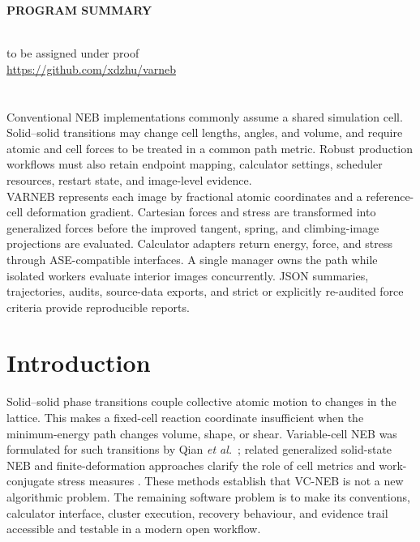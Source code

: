 \documentclass[final,3p,times]{elsarticle}
\begin{document}
{\bf PROGRAM SUMMARY}
\begin{small}
\\
 to be assigned under proof\\
 \url{https://github.com/xdzhu/varneb}\\
\\
\\
 Conventional NEB implementations commonly
assume a shared simulation cell. Solid--solid transitions may change cell
lengths, angles, and volume, and require atomic and cell forces to be treated
in a common path metric. Robust production workflows must also retain endpoint
mapping, calculator settings, scheduler resources, restart state, and
image-level evidence.\\
 VARNEB represents each image by fractional
atomic coordinates and a reference-cell deformation gradient. Cartesian forces
and stress are transformed into generalized forces before the improved tangent,
spring, and climbing-image projections are evaluated. Calculator adapters
return energy, force, and stress through ASE-compatible interfaces. A single
manager owns the path while isolated workers evaluate interior images
concurrently. JSON summaries, trajectories, audits, source-data exports, and
strict or explicitly re-audited force criteria provide reproducible reports.
\end{small}

\section{Introduction}
\label{sec:introduction}

Solid--solid phase transitions couple collective atomic motion to changes in
the lattice. This makes a fixed-cell reaction coordinate insufficient when the
minimum-energy path changes volume, shape, or shear. Variable-cell NEB was
formulated for such transitions by Qian \emph{et al.}\ \cite{Qian2013}; related
generalized solid-state NEB and finite-deformation approaches clarify the role
of cell metrics and work-conjugate stress measures
\cite{Sheppard2012,Ghasemi2019}. These methods establish that VC-NEB is not a
new algorithmic problem. The remaining software problem is to make its
conventions, calculator interface, cluster execution, recovery behaviour, and
evidence trail accessible and testable in a modern open workflow.
\end{document}

